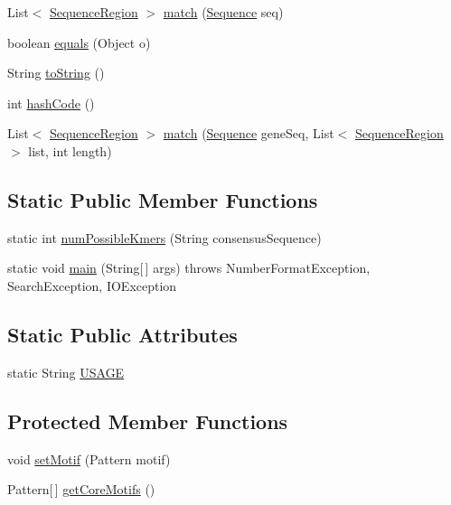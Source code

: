 \begin{DoxyCompactItemize}
\item 
List$<$ \hyperlink{classbroad_1_1core_1_1sequence_1_1_sequence_region}{Sequence\+Region} $>$ \hyperlink{classbroad_1_1core_1_1motif_1_1_sequence_motif_ae2940cf15beb430edcb54b937d0212a7}{match} (\hyperlink{classbroad_1_1core_1_1sequence_1_1_sequence}{Sequence} seq)
\item 
boolean \hyperlink{classbroad_1_1core_1_1motif_1_1_sequence_motif_aea038650cf2e930ef84d69140a537912}{equals} (Object o)
\item 
String \hyperlink{classbroad_1_1core_1_1motif_1_1_sequence_motif_a67d1aab1250fca5a725386a85d1692a8}{to\+String} ()
\item 
int \hyperlink{classbroad_1_1core_1_1motif_1_1_sequence_motif_a23cf80266e3f2bf41462a201f86db123}{hash\+Code} ()
\item 
List$<$ \hyperlink{classbroad_1_1core_1_1sequence_1_1_sequence_region}{Sequence\+Region} $>$ \hyperlink{classbroad_1_1core_1_1motif_1_1_sequence_motif_af45a08c4d46e73afc13e9fc164285d7a}{match} (\hyperlink{classbroad_1_1core_1_1sequence_1_1_sequence}{Sequence} gene\+Seq, List$<$ \hyperlink{classbroad_1_1core_1_1sequence_1_1_sequence_region}{Sequence\+Region} $>$ list, int length)
\end{DoxyCompactItemize}
\subsection*{Static Public Member Functions}
\begin{DoxyCompactItemize}
\item 
static int \hyperlink{classbroad_1_1core_1_1motif_1_1_sequence_motif_af3d74a5537fe28f9967d540807db0b66}{num\+Possible\+Kmers} (String consensus\+Sequence)
\item 
static void \hyperlink{classbroad_1_1core_1_1motif_1_1_sequence_motif_a6e112f9e21d5579de3ffa27cc89c8cde}{main} (String\mbox{[}$\,$\mbox{]} args)  throws Number\+Format\+Exception, Search\+Exception, I\+O\+Exception 
\end{DoxyCompactItemize}
\subsection*{Static Public Attributes}
\begin{DoxyCompactItemize}
\item 
static String \hyperlink{classbroad_1_1core_1_1motif_1_1_sequence_motif_a42b39e7c23f08eb5d93f51d06f1826fb}{U\+S\+A\+G\+E}
\end{DoxyCompactItemize}
\subsection*{Protected Member Functions}
\begin{DoxyCompactItemize}
\item 
void \hyperlink{classbroad_1_1core_1_1motif_1_1_sequence_motif_a1e4c678e3e9cf04d053ac2f7538e70f1}{set\+Motif} (Pattern motif)
\item 
Pattern\mbox{[}$\,$\mbox{]} \hyperlink{classbroad_1_1core_1_1motif_1_1_sequence_motif_a8a590ae198b7351cd4e774b580c9f4ca}{get\+Core\+Motifs} ()
\end{DoxyCompactItemize}



